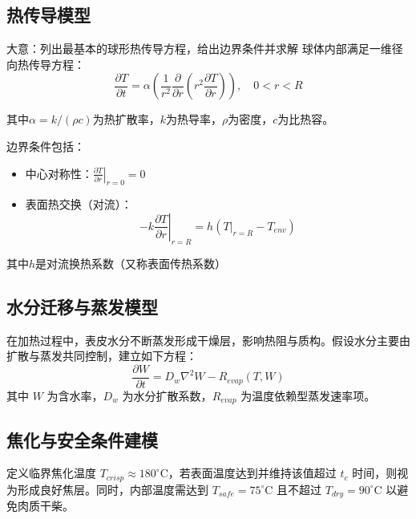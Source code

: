 \documentclass[12pt]{article}
\begin{document}
\subsection{热传导模型}
大意：列出最基本的球形热传导方程，给出边界条件并求解
球体内部满足一维径向热传导方程：
\begin{equation}
\frac{\partial T}{\partial t} = \alpha \left( \frac{1}{r^2} \frac{\partial}{\partial r}\left(r^2 \frac{\partial T}{\partial r} \right) \right), \quad 0 < r < R
\label{eq:1}
\end{equation}
\par 其中\(\alpha = k/(\rho c)\)为热扩散率，$k$为热导率，\(\rho\)为密度，$c$为比热容。
\par 边界条件包括：
\begin{itemize}
\item 中心对称性：$\left.\frac{\partial T}{\partial r}\right|_{r=0} = 0$
\item 表面热交换（对流）：
\begin{equation}
-k \left.\frac{\partial T}{\partial r}\right|_{r=R} = h(\left.T\right|_{r=R} - T_{env})
\end{equation}
\end{itemize}
\par 其中$h$是对流换热系数（又称表面传热系数）

\subsection{水分迁移与蒸发模型}
在加热过程中，表皮水分不断蒸发形成干燥层，影响热阻与质构。假设水分主要由扩散与蒸发共同控制，建立如下方程：
\begin{equation}
\frac{\partial W}{\partial t} = D_w \nabla^2 W - R_{evap}(T, W)
\end{equation}
其中 $W$ 为含水率，$D_w$ 为水分扩散系数，$R_{evap}$ 为温度依赖型蒸发速率项。

\subsection{焦化与安全条件建模}

定义临界焦化温度 $T_{crisp} \approx 180^\circ$C，若表面温度达到并维持该值超过 $t_c$ 时间，则视为形成良好焦层。同时，内部温度需达到 $T_{safe} = 75^\circ$C 且不超过 $T_{dry} = 90^\circ$C 以避免肉质干柴。
\end{document}
